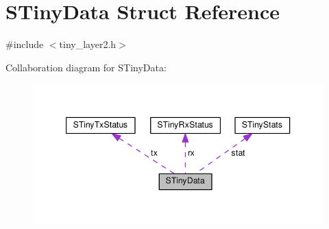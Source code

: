 \hypertarget{structSTinyData}{}\section{S\+Tiny\+Data Struct Reference}
\label{structSTinyData}


{\ttfamily \#include $<$tiny\+\_\+layer2.\+h$>$}



Collaboration diagram for S\+Tiny\+Data\+:\nopagebreak
\begin{figure}[H]
\begin{center}
\leavevmode
\includegraphics[width=347pt]{structSTinyData__coll__graph}
\end{center}
\end{figure}
